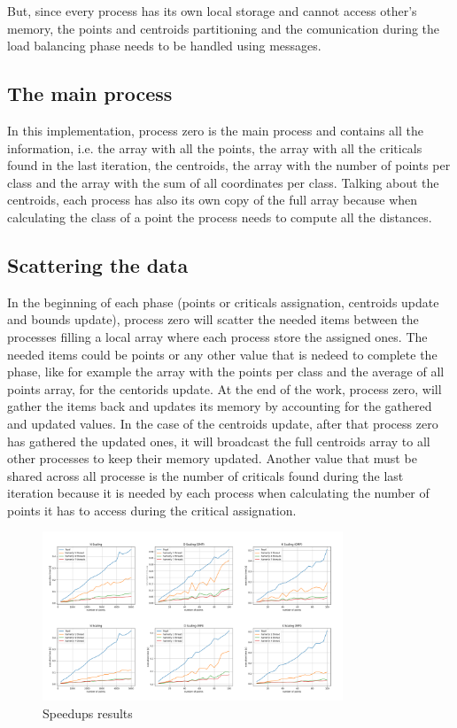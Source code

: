 \documentclass[conference]{IEEEtran}
\begin{document}
But, since every process has its own local storage and cannot access other's memory, the points and centroids partitioning and the comunication during the load balancing phase needs to be handled using messages. 

\subsection{The main process}
In this implementation, process zero is the main process and contains all the information, i.e. the array with all the points, the array with all the criticals found in the last iteration, the centroids, the array with the number of points per class and the array with the sum of all coordinates per class. Talking about the centroids, each process has also its own copy of the full array because when calculating the class of a point the process needs to compute all the distances.

\subsection{Scattering the data}
In the beginning of each phase (points or criticals assignation, centroids update and bounds update), process zero will scatter the needed items between the processes filling a local array where each process store the assigned ones. The needed items could be points or any other value that is nedeed to complete the phase, like for example the array with the points per class and the average of all points array, for the centorids update. At the end of the work, process zero, will gather the items back and updates its memory by accounting for the gathered and updated values. In the case of the centroids update, after that process zero has gathered the updated ones, it will broadcast the full centroids array to all other processes to keep their memory updated. Another value that must be shared across all processe is the number of criticals found during the last iteration because it is needed by each process when calculating the number of points it has to access during the critical assignation.

\begin{figure}
    \centering
    \caption{Speedups results}
    \label{fig:test_res}
    \includegraphics[width = 0.8\textwidth]{imgs/timeplts.png}
\end{figure}
\end{document}
